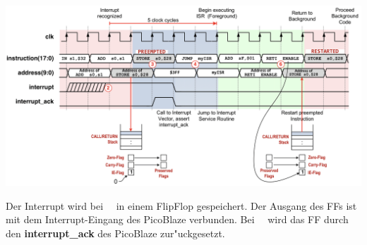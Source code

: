 \includegraphics[width=18cm]{pics/7-Interrupts_Timing}

Der Interrupt wird bei \color{red}\color{black} \ \ in einem FlipFlop gespeichert. Der Ausgang des FFs ist mit dem Interrupt-Eingang des PicoBlaze verbunden. Bei \color{red}\color{black} \ \ wird das FF durch den \textbf{interrupt\_ack} des PicoBlaze zur"uckgesetzt.